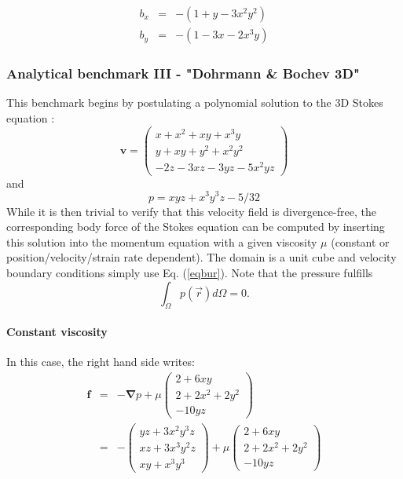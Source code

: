 \begin{eqnarray}
b_x &=& - (1+y-3x^2y^2) \\
b_y &=& - (1-3x-2x^3y) 
\end{eqnarray}


\subsubsection{Analytical benchmark III \label{mms3} - "Dohrmann \& Bochev 3D"}

This benchmark begins by postulating a polynomial solution 
to the 3D Stokes equation \cite{dobo04}:
\begin{equation}
{\bm v}
=
\left(
\begin{array}{c}
x+x^2+xy+x^3y \\
y + xy + y^2 + x^2 y^2\\
-2z - 3xz - 3yz - 5x^2 yz
\end{array}
\right)
\label{eqbur}
\end{equation}
and
\begin{equation}
p = xyz + x^3 y^3z - 5/32
\end{equation}
While it is then trivial to verify that this velocity field is divergence-free,  
the corresponding body force of the Stokes equation can be computed by  
inserting this solution into the momentum equation with a given viscosity $\mu$
(constant or position/velocity/strain rate dependent). 
The domain is a unit cube and velocity boundary conditions 
simply use Eq. (\ref{eqbur}). 
Note that the pressure fulfills 
\[
\int_\Omega p({\vec r}) d\Omega = 0.  
\]


\paragraph{Constant viscosity}
In this case, the right hand side writes:
\begin{eqnarray}
{\bm f} &=& 
-{\bm \nabla p} + 
\mu
\left(
\begin{array}{c}
2+6xy \\
2+2x^2+2y^2 \\
-10yz
\end{array}
\right) \nonumber\\
&=&
-
\left(
\begin{array}{c}
yz+3x^2 y^3z \\
xz+3 x^3 y^2 z \\
xy+x^3y^3
\end{array}
\right) 
+
\mu
\left(
\begin{array}{c}
2+6xy \\
2+2x^2+2y^2 \\
-10yz
\end{array}
\right)
\nonumber
\end{eqnarray}

